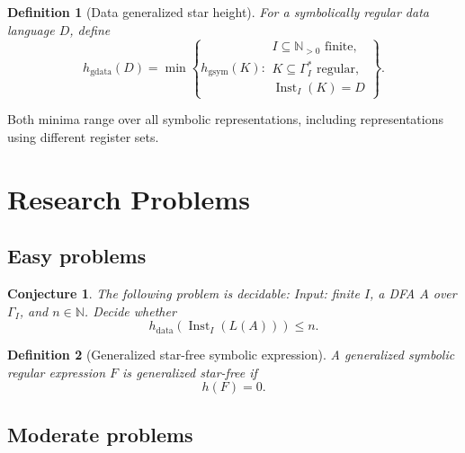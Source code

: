 \documentclass[11pt]{article}
\newtheorem{definition}{Definition}
\newtheorem{conjecture}{Conjecture}
\begin{document}
\begin{definition}[Data generalized star height]
For a symbolically regular data language $D$, define
\[
 h_{\mathrm{gdata}}(D)=
 \min\left\{
 h_{\mathrm{gsym}}(K):
 \begin{array}{l}
 I\subseteq\mathbb N_{>0}\text{ finite},\\
 K\subseteq\Gamma_I^*\text{ regular},\\
 \operatorname{Inst}_I(K)=D
 \end{array}
 \right\}.
\]
\end{definition}

Both minima range over all symbolic representations, including
representations using different register sets.

\section{Research Problems }

\subsection{Easy problems}



\begin{conjecture}
The following problem is decidable:
Input: finite $I$, a DFA $A$ over $\Gamma_I$, and $n\in\mathbb N$.
Decide whether
\[
 h_{\mathrm{data}}(\operatorname{Inst}_I(L(A)))\leq n.
\]
\end{conjecture}


\begin{definition}[Generalized star-free symbolic expression]
A generalized symbolic regular expression $F$ is
\emph{generalized star-free} if
\[
  h(F)=0.
\]
\end{definition}







\subsection{Moderate problems}
\end{document}
